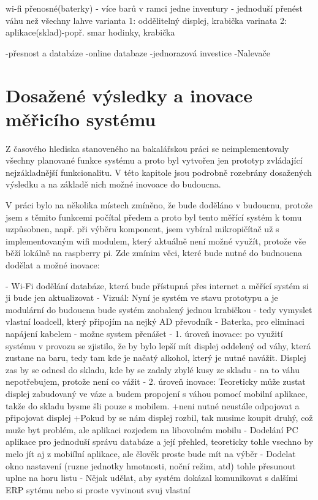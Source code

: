 



wi-fi
přenosné(baterky) - více barů v ramci jedne inventury - jednoduší přenést váhu než všechny lahve
varianta 1: oddělitelný displej, krabička
varinata 2: aplikace(sklad)-popř. smar hodinky, krabička


-přesnost a databáze
    -online databaze
    -jednorazová investice
-Nalevače

\chapter{Dosažené výsledky a inovace měřicího systému}
Z časového hlediska stanoveného na bakalářskou práci se neimplementovaly všechny planované funkce systému a proto byl vytvořen jen prototyp zvládající nejzákladnější funkcionalitu. V této kapitole jsou podrobně rozebrány dosažených výsledku a na základě nich možné inovoace do budoucna. 

V práci bylo na několika místech zmíněno, že bude doděláno v budoucnu, protože jsem s těmito funkcemi počítal předem a proto byl tento měřící systém k tomu uzpůsobnen, např. při výběru komponent, jsem vybíral mikropičítač už s implementovaným wifi modulem, který aktuálně není možné využít, protože vše běží lokálně na raspberry pi.
Zde zmínim věci, které bude nutné do budnoucna dodělat a možné inovace:

- Wi-Fi dodělání databáze, která bude přístupná přes internet a měřící systém si ji bude jen aktualizovat
- Vizuál: Nyní je systém ve stavu prototypu a je modulární do budoucna bude systém zaobalený jednou krabičkou - tedy vymyslet vlastní loadcell, který připojím na nejký AD převodník
- Baterka, pro eliminaci napájení kabelem - možne system přenášet 
- 1. úroveň inovace: po využití systému v provozu se zjistilo, že by bylo lepší mít displej oddelený od váhy, která zustane na baru, tedy tam kde je načatý alkohol, který je nutné navážit. Displej zas by se odnesl do skladu, kde by se zadaly zbylé kusy ze skladu - na to váhu nepotřebujem, protože není co vážit
- 2. úroveň inovace: Teoreticky může zustat displej zabudovaný ve váze a budem propojení s váhou pomocí mobilní aplikace, takže do skladu bysme šli pouze s mobilem.
    +neni nutné neustále odpojovat a připojovat displej
    +Pokud by se nám displej rozbil, tak musime koupit druhý, což muže byt problém, ale aplikaci rozjedem na libovolném mobilu
- Dodelání PC aplikace pro jednoduší správu databáze a její přehled, teoreticky tohle vsechno by melo jít aj z mobiílní aplikace, ale člověk proste bude mít na výběr 
- Dodelat okno nastavení (ruzne jednotky hmotnosti, noční režim, atd) tohle přesunout uplne na horu listu
- Nějak udělat, aby systém dokázal komunikovat s dalšími ERP sytému nebo si proste vyvinout svuj vlastní

